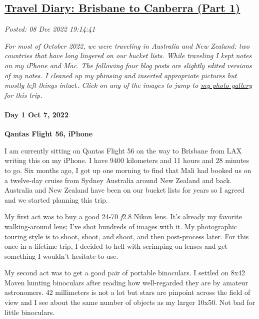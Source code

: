 %

\subsection*{\href{http://analyzethedatanotthedrivel.org/2022/12/08/travel-diary-brisbane-to-canberra-part-1/}{Travel Diary: Brisbane to Canberra (Part 1)}}


\noindent\emph{Posted: 08 Dec 2022 19:14:41}
\vspace{6pt}

\emph{For most of October 2022, we were traveling in
Australia and New Zealand: two countries that have long lingered on our
bucket lists. While traveling I kept notes on my iPhone and Mac. The
following four blog posts are slightly edited versions of my notes. I
cleaned up my phrasing and inserted appropriate pictures but mostly left
things inta}ct\emph{. Click on any of the images to jump to
\href{https://conceptcontrol.smugmug.com/Trips/Overseas/Australia-New-Zealand-2022/}{my
photo gallery} for this trip.}

\hypertarget{day-1-oct-7-2022}{%
\paragraph{\texorpdfstring{\textbf{Day 1 Oct 7,
2022}}{Day 1 Oct 7, 2022}}\label{day-1-oct-7-2022}}

\textbf{Qantas Flight 56, iPhone}

I am currently sitting on Qantas Flight 56 on the way to Brisbane from
LAX writing this on my iPhone. I have 9400 kilometers and 11 hours and
28 minutes to go. Six months ago, I got up one morning to find that Mali
had booked us on a twelve-day cruise from Sydney Australia around New
Zealand and back. Australia and New Zealand have been on our bucket
lists for years so I agreed and we started planning this trip.

My first act was to buy a good 24-70 \textit{f}2.8 Nikon lens. It's already my
favorite walking-around lens; I've shot hundreds of images with it. My
photographic touring style is to shoot, shoot, and shoot, and then
post-process later. For this once-in-a-lifetime trip, I decided to hell
with scrimping on lenses and get something I wouldn't hesitate to use.

My second act was to get a good pair of portable binoculars. I settled
on 8x42 Maven hunting binoculars after reading how well-regarded they
are by amateur astronomers. 42 millimeters is not a lot but stars are
pinpoint across the field of view and I see about the same number of
objects as my larger 10x50. Not bad for little binoculars.

